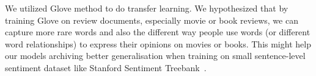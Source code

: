 We utilized Glove method to do transfer learning.
We hypothesized that by training Glove on review documents, especially movie or book reviews, we can capture more rare words and also the different way people use words (or different word relationships) to express their opinions on movies or books.
This might help our models archiving better generalisation when training on small sentence-level sentiment dataset like Stanford Sentiment Treebank~\cite{socher2013recursive}.
